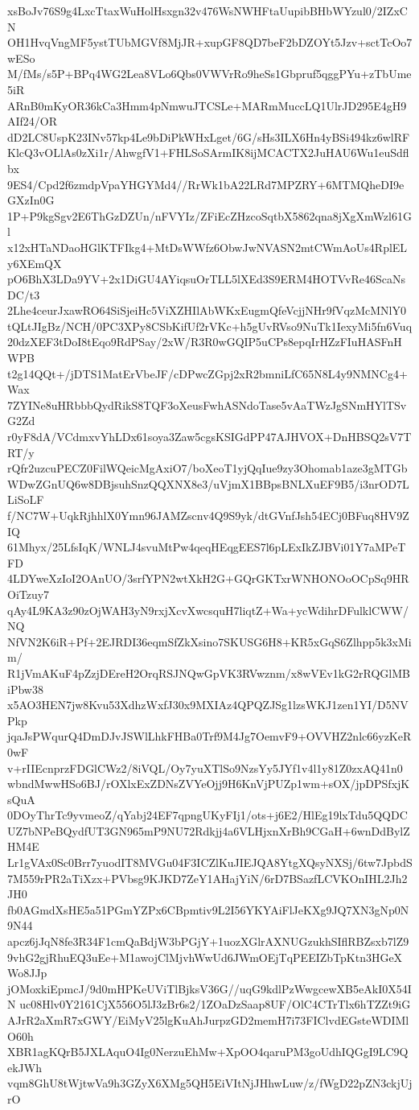 xsBoJv76S9g4LxcTtaxWuHolHsxgn32v476WsNWHFtaUupibBHbWYzul0/2IZxCN
OH1HvqVngMF5ystTUbMGVf8MjJR+xupGF8QD7beF2bDZOYt5Jzv+sctTcOo7wESo
M/fMs/s5P+BPq4WG2Lea8VLo6Qbs0VWVrRo9heSs1Gbpruf5qggPYu+zTbUme5iR
ARnB0mKyOR36kCa3Hmm4pNmwuJTCSLe+MARmMuccLQ1UlrJD295E4gH9AIf24/OR
dD2LC8UspK23INv57kp4Le9bDiPkWHxLget/6G/sHs3ILX6Hn4yBSi494kz6wlRF
KlcQ3vOLlAs0zXi1r/AhwgfV1+FHLSoSArmIK8ijMCACTX2JuHAU6Wu1euSdflbx
9ES4/Cpd2f6zmdpVpaYHGYMd4//RrWk1bA22LRd7MPZRY+6MTMQheDI9eGXzIn0G
1P+P9kgSgv2E6ThGzDZUn/nFVYIz/ZFiEcZHzcoSqtbX5862qna8jXgXmWzl61Gl
x12xHTaNDaoHGlKTFIkg4+MtDsWWfz6ObwJwNVASN2mtCWmAoUs4RplELy6XEmQX
pO6BhX3LDa9YV+2x1DiGU4AYiqsuOrTLL5lXEd3S9ERM4HOTVvRe46ScaNsDC/t3
2Lhe4ceurJxawRO64SiSjeiHc5ViXZHIlAbWKxEugmQfeVcjjNHr9fVqzMcMNlY0
tQLtJIgBz/NCH/0PC3XPy8CSbKifUf2rVKc+h5gUvRVso9NuTk1IexyMi5fn6Vuq
20dzXEF3tDoI8tEqo9RdPSay/2xW/R3R0wGQIP5uCPs8epqIrHZzFIuHASFnHWPB
t2g14QQt+/jDTS1MatErVbeJF/cDPwcZGpj2xR2bmniLfC65N8L4y9NMNCg4+Wax
7ZYINe8uHRbbbQydRikS8TQF3oXeusFwhASNdoTase5vAaTWzJgSNmHYlTSvG2Zd
r0yF8dA/VCdmxvYhLDx61soya3Zaw5cgsKSIGdPP47AJHVOX+DnHBSQ2sV7TRT/y
rQfr2uzcuPECZ0FilWQeicMgAxiO7/boXeoT1yjQqIue9zy3Ohomab1aze3gMTGb
WDwZGnUQ6w8DBjsuhSnzQQXNX8e3/uVjmX1BBpsBNLXuEF9B5/i3nrOD7LLiSoLF
f/NC7W+UqkRjhhlX0Ymn96JAMZscnv4Q9S9yk/dtGVnfJsh54ECj0BFuq8HV9ZIQ
61Mhyx/25LfsIqK/WNLJ4svuMtPw4qeqHEqgEES7l6pLExIkZJBVi01Y7aMPeTFD
4LDYweXzIoI2OAnUO/3srfYPN2wtXkH2G+GQrGKTxrWNHONOoOCpSq9HROiTzuy7
qAy4L9KA3z90zOjWAH3yN9rxjXcvXwcsquH7liqtZ+Wa+ycWdihrDFulklCWW/NQ
NfVN2K6iR+Pf+2EJRDI36eqmSfZkXsino7SKUSG6H8+KR5xGqS6Zlhpp5k3xMim/
R1jVmAKuF4pZzjDEreH2OrqRSJNQwGpVK3RVwznm/x8wVEv1kG2rRQGlMBiPbw38
x5AO3HEN7jw8Kvu53XdhzWxfJ30x9MXIAz4QPQZJSg1lzsWKJ1zen1YI/D5NVPkp
jqaJsPWqurQ4DmDJvJSWlLhkFHBa0Trf9M4Jg7OemvF9+OVVHZ2nlc66yzKeR0wF
v+rIIEcnprzFDGlCWz2/8iVQL/Oy7yuXTlSo9NzsYy5JYf1v4l1y81Z0zxAQ41n0
wbndMwwHSo6BJ/rOXlxExZDNsZVYeOjj9H6KnVjPUZp1wm+sOX/jpDPSfxjKsQuA
0DOyThrTc9yvmeoZ/qYabj24EF7qpngUKyFIj1/ots+j6E2/HlEg19lxTdu5QQDC
UZ7bNPeBQydfUT3GN965mP9NU72Rdkjj4a6VLHjxnXrBh9CGaH+6wnDdBylZHM4E
Lr1gVAx0Sc0Brr7yuodIT8MVGu04F3ICZlKuJIEJQA8YtgXQsyNXSj/6tw7JpbdS
7M559rPR2aTiXzx+PVbsg9KJKD7ZeY1AHajYiN/6rD7BSazfLCVKOnIHL2Jh2JH0
fb0AGmdXsHE5a51PGmYZPx6CBpmtiv9L2I56YKYAiFlJeKXg9JQ7XN3gNp0N9N44
apcz6jJqN8fe3R34F1cmQaBdjW3bPGjY+1uozXGlrAXNUGzukhSIflRBZsxb7lZ9
9vhG2gjRhuEQ3uEe+M1awojClMjvhWwUd6JWmOEjTqPEEIZbTpKtn3HGeXWo8JJp
jOMoxkiEpmcJ/9d0mHPKeUViTlBjksV36G//uqG9kdlPzWwgcewXB5eAkI0X54IN
uc08Hlv0Y2161CjX556O5lJ3zBr6s2/1ZOaDzSaap8UF/OlC4CTrTlx6hTZZt9iG
AJrR2aXmR7xGWY/EiMyV25lgKuAhJurpzGD2memH7i73FIClvdEGsteWDIMlO60h
XBR1agKQrB5JXLAquO4Ig0NerzuEhMw+XpOO4qaruPM3goUdhIQGgI9LC9QekJWh
vqm8GhU8tWjtwVa9h3GZyX6XMg5QH5EiVItNjJHhwLuw/z/fWgD22pZN3ckjUjrO
